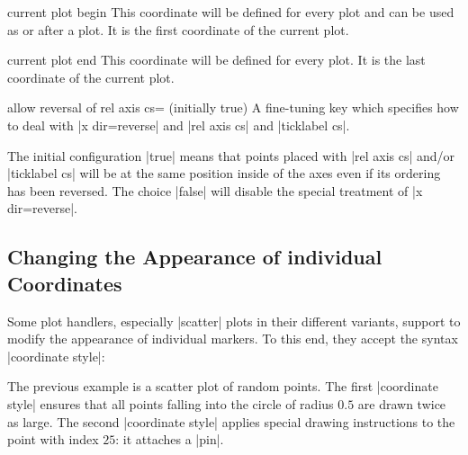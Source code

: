 \begin{predefinednode}{current plot begin}
    This coordinate will be defined for every plot and can be used as
     or after a plot. It is the first coordinate
    of the current plot.
\end{predefinednode}

\begin{predefinednode}{current plot end}
    This coordinate will be defined for every plot. It is the last coordinate
    of the current plot.
\end{predefinednode}

\begin{pgfplotskey}{allow reversal of rel axis cs= (initially true)}
    A fine-tuning key which specifies how to deal with |x dir=reverse| and
    |rel axis cs| and |ticklabel cs|.

    The initial configuration |true| means that points placed with
    |rel axis cs| and/or |ticklabel cs| will be at the same position inside of
    the axes even if its ordering has been reversed. The choice |false| will
    disable the special treatment of |x dir=reverse|.
\end{pgfplotskey}

\subsection{Changing the Appearance of individual Coordinates}
\label{sec:coordinate:style}

Some plot handlers, especially |scatter| plots in their different variants, support to modify the appearance of individual markers. To this end, they accept the syntax |coordinate style|:

\begin{codeexample}[]
\end{codeexample}
The previous example is a scatter plot of random points. The first |coordinate style| ensures that all points falling into the circle of radius $0.5$ are drawn twice as large. The second |coordinate style| applies special drawing instructions to the point with index $25$: it attaches a |pin|.

